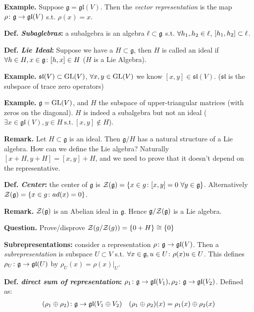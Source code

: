 \documentclass[]{../../../../tex/classes/styledArticle}
\newcommand\gl {\mathfrak{gl}}
\newcommand\g  {\mathfrak{g}}
\newcommand\Sl {\mathfrak{sl}}
\begin{document}
	\textbf{Example. }Suppose $\g = \gl(V)$. Then the \textit{vector representation} is the map $\rho \co \g \to \gl(V)$ s.t. $\rho(x) = x$. 
	
	\textbf{Def. \textit{Subaglebras}: } a subalgebra is an algebra $\ml \subset \g$ s.t. $\forall h_1, h_2 \in \ell$, $[h_1, h_2] \subset \ell$. 
	
	\textbf{Def. \textit{Lie Ideal}: }Suppose we have a $H \subset \g$, then $H$ is called an ideal if $\forall h \in H, x \in \g\co [h, x] \in H$ ($H$ is a Lie Algebra). 
	
	\textbf{Example. }$\Sl(V) \subset \gGL(V)$, $\forall x, y \in \mathrm{GL}(V)$ we know $[x, y] \in \Sl(V)$. ($\Sl$ is the subspace of trace zero operators)
	
	\textbf{Example. }$\g = \gGL(V)$, and $H$ the subspace of upper-triangular matrices (with zeros on the diagonal). $H$ is indeed a subalgebra but not an ideal ($\exists x \in \gl(V), y \in H \ \text{s.t.}\  [x, y] \notin H$). 
	
	\textbf{Remark. }Let $H \subset \g$ is an {ideal}. Then $\g/H$ has a natural structure of a Lie algebra. How can we define the Lie algebra? Naturally $[x + H, y + H] = [x, y] + H$, and we need to prove that it doesn't depend on the representative. 
	
	\textbf{Def. \textit{Center}: }the center of $\g$ is $\zc(\g) = \ccb{x \in g \co [x, y] =0 \ \forall y \in \g}$. Alternatively $\zc(\g) = \{x \in g \co ad(x) = 0\}$. 
	
	\textbf{Remark. }$\zc(\g)$ is an Abelian ideal in $\g$. Hence $\g/\zc(\g)$ is a Lie algebra. 
	
	\textbf{Question. }Prove/disprove $\mathcal{Z}(g/\mathcal{Z}(g)) = \{0 + H\} \cong \{0\}$ 
	
%	
	\textbf{Subrepresentations: }consider a representation $\rho \co \g \to \gl(V)$. Then a \textit{subrepresentation} is subspace $U \subset V$ s.t. $\forall x \in \g, u \in U \co \rho(x)u \in U$. This defines $\rho_U \co \g \to \gl(U)$ by $\rho_U(x) = \rho(x)|_{U}$. 
	
	\textbf{Def. \textit{direct sum of representation}: }$\rho_1 \co \g \to \gl(V_1), \rho_2 \co \g \to \gl(V_2)$. Defined as: 
	\begin{align*}
		(\rho_1 \oplus \rho_2) \co \g \to \gl(V_1 \oplus V_2) && (\rho_1 \oplus \rho_2)(x) = \rho_1(x) \oplus \rho_2(x)
	\end{align*}
	
\end{document}
